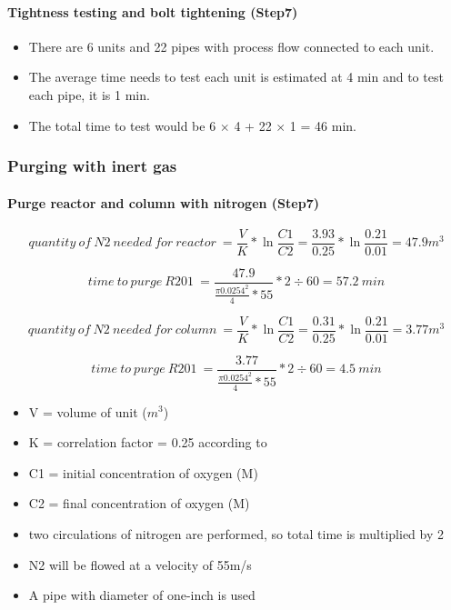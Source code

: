 \paragraph{Tightness testing and bolt tightening (Step7)}
 \begin{itemize}
        \item There are 6 units and 22 pipes with process flow connected to each unit.
        \item The average time needs to test each unit is estimated at 4 min and to test each pipe, it is 1 min.
        \item The total time to test would be 6 $\times$ 4 + 22 $\times$ 1 = 46 min.
    \end{itemize}
    
\subsubsection{Purging with inert gas}

\paragraph{Purge reactor and column with nitrogen (Step7)}

 \begin{equation}
        quantity\:of\:N2\:needed\:for\:reactor\:=\frac{V}{K} * \ln \frac{C1}{C2} = \frac{3.93}{0.25} * \ln \frac{0.21}{0.01} = 47.9 m^3
    \end{equation}
    
    \begin{equation}
        time\:to\:purge\:R201\:=\frac{47.9}{\frac{\pi 0.0254^2}{4} * 55} * 2 \div 60 = 57.2\:min
    \end{equation}
    
    \begin{equation}
        quantity\:of\:N2\:needed\:for\:column\:=\frac{V}{K} * \ln \frac{C1}{C2} = \frac{0.31}{0.25} * \ln \frac{0.21}{0.01} = 3.77 m^3
    \end{equation}
    
    \begin{equation}
        time\:to\:purge\:R201\:=\frac{3.77}{\frac{\pi 0.0254^2}{4} * 55} * 2 \div 60 = 4.5\:min
    \end{equation}
    
    \begin{itemize}
        \item V = volume of unit ($m^3$)
        \item K = correlation factor = 0.25 according to \textcite{}
        \item C1 = initial concentration of oxygen (M)
        \item C2 = final concentration of oxygen (M)
        \item two circulations of nitrogen are performed, so total time is multiplied by 2
        \item N2 will be flowed at a velocity of 55m/s
        \item A pipe with diameter of one-inch is used
    \end{itemize}
    
